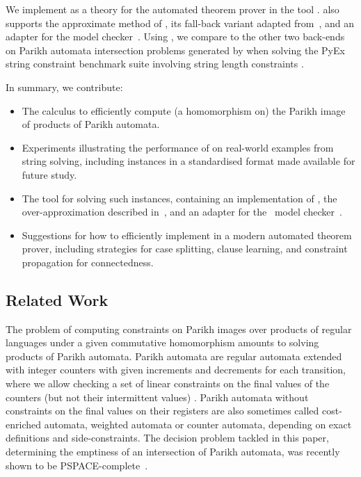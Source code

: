 We implement \Calculus{} as a theory for the \Princess{} automated theorem
prover in the tool \Catra. \Catra{} also supports the approximate method of
\cite{approximate-parikh}, its fall-back variant adapted
from~\cite{generate-parikh-image}, and an adapter for the \Nuxmv{} model
checker~\cite{nuxmv}. Using \Catra, we compare \Calculus{} to the other two
back-ends on \NrBenchmarks{} Parikh automata intersection problems generated by
\OstrichPlus{} when solving the PyEx string constraint benchmark suite involving
string length constraints \cite{pyex}.

In summary, we contribute:
\begin{itemize}
\item The \Calculus{} calculus to efficiently compute (a homomorphism on) the
Parikh image of products of Parikh automata.
\item Experiments illustrating the performance of \Calculus{} on real-world examples from string solving, including \NrBenchmarks{} instances in a standardised format made available for future study.
\item The \Catra{} tool for solving such instances, containing an implementation of \Calculus{}, the over-approximation described in~\cite{approximate-parikh}, and an adapter for the~\Nuxmv{} model checker~\cite{nuxmv}.
\item Suggestions for how to efficiently implement \Calculus{} in a modern automated theorem prover, including strategies for case splitting, clause learning, and constraint propagation for connectedness.
\end{itemize}

\subsection{Related Work}

The problem of computing constraints on Parikh images over products of regular
languages under a given commutative homomorphism amounts to solving products of
Parikh automata. Parikh automata are regular automata extended with integer
counters with given increments and decrements for each transition, where we
allow checking a set of linear constraints on the final values of the counters
(but not their intermittent values) \cite{parikh-automata}. Parikh automata
without constraints on the final values on their registers are also sometimes
called cost-enriched automata, weighted automata or counter automata, depending
on exact definitions and side-constraints. The decision problem tackled in this
paper, determining the emptiness of an intersection of Parikh automata, was
recently shown to be PSPACE-complete~\cite{graph-queries}.

